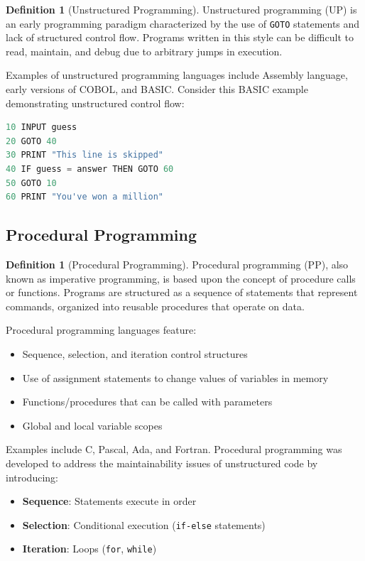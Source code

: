 \documentclass[11pt, a4paper, notitlepage]{report}
\theoremstyle{definition}
\newtheorem{definition}[theorem]{Definition}
\theoremstyle{remark}
\theoremstyle{definition}
\begin{document}
\begin{definition}[Unstructured Programming]
\label{def:ch1-unstructured}
Unstructured programming (UP) is an early programming paradigm characterized by the use of \texttt{GOTO} statements and lack of structured control flow. Programs written in this style can be difficult to read, maintain, and debug due to arbitrary jumps in execution.
\end{definition}

Examples of unstructured programming languages include Assembly language, early versions of COBOL, and BASIC. Consider this BASIC example demonstrating unstructured control flow:

\begin{lstlisting}[language=Java, caption=Unstructured BASIC code example]
10 INPUT guess
20 GOTO 40
30 PRINT "This line is skipped"
40 IF guess = answer THEN GOTO 60
50 GOTO 10
60 PRINT "You've won a million"
\end{lstlisting}

\subsection{Procedural Programming}

\begin{definition}[Procedural Programming]
\label{def:ch1-procedural}
Procedural programming (PP), also known as imperative programming, is based upon the concept of procedure calls or functions. Programs are structured as a sequence of statements that represent commands, organized into reusable procedures that operate on data.
\end{definition}

\begin{keyresult}[title={Key Characteristics of Procedural Programming}]
Procedural programming languages feature:
\begin{itemize}
  \item Sequence, selection, and iteration control structures
  \item Use of assignment statements to change values of variables in memory
  \item Functions/procedures that can be called with parameters
  \item Global and local variable scopes
\end{itemize}
\end{keyresult}

Examples include C, Pascal, Ada, and Fortran. Procedural programming was developed to address the maintainability issues of unstructured code by introducing:
\begin{itemize}
  \item \textbf{Sequence}: Statements execute in order
  \item \textbf{Selection}: Conditional execution (\texttt{if-else} statements)
  \item \textbf{Iteration}: Loops (\texttt{for}, \texttt{while})
\end{itemize}
\end{document}
